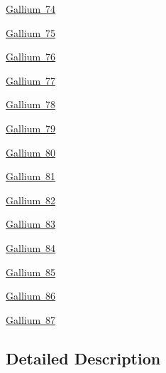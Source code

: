 \begin{DoxyCompactItemize}
\item 
\mbox{\hyperlink{group___isotope_const-_gallium-_ga74}{Gallium 74}}
\item 
\mbox{\hyperlink{group___isotope_const-_gallium-_ga75}{Gallium 75}}
\item 
\mbox{\hyperlink{group___isotope_const-_gallium-_ga76}{Gallium 76}}
\item 
\mbox{\hyperlink{group___isotope_const-_gallium-_ga77}{Gallium 77}}
\item 
\mbox{\hyperlink{group___isotope_const-_gallium-_ga78}{Gallium 78}}
\item 
\mbox{\hyperlink{group___isotope_const-_gallium-_ga79}{Gallium 79}}
\item 
\mbox{\hyperlink{group___isotope_const-_gallium-_ga80}{Gallium 80}}
\item 
\mbox{\hyperlink{group___isotope_const-_gallium-_ga81}{Gallium 81}}
\item 
\mbox{\hyperlink{group___isotope_const-_gallium-_ga82}{Gallium 82}}
\item 
\mbox{\hyperlink{group___isotope_const-_gallium-_ga83}{Gallium 83}}
\item 
\mbox{\hyperlink{group___isotope_const-_gallium-_ga84}{Gallium 84}}
\item 
\mbox{\hyperlink{group___isotope_const-_gallium-_ga85}{Gallium 85}}
\item 
\mbox{\hyperlink{group___isotope_const-_gallium-_ga86}{Gallium 86}}
\item 
\mbox{\hyperlink{group___isotope_const-_gallium-_ga87}{Gallium 87}}
\end{DoxyCompactItemize}


\subsection{Detailed Description}
